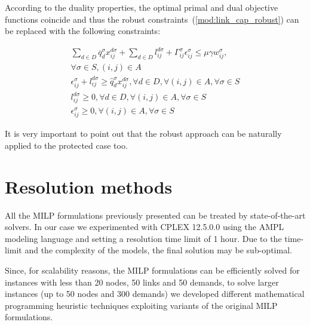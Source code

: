 \documentclass[final,5p,times,twocolumn]{elsarticle}
\begin{document}
According to the duality properties, the optimal primal and dual objective functions coincide and thus  the  robust constraints~(\ref{mod:link_cap_robust})  can be replaced with the following constraints:

\begin{eqnarray}
\label{mod:final_constraints_1}\sum_{d \in D} \overline{q}_d^{\sigma}x_{ij}^{d \sigma}+  \sum_{d \in D}l_{ij}^{d\sigma}+\Gamma_{ij}^{\sigma}\epsilon_{ij}^{\sigma} \leq \mu \gamma w_{ij}^{\sigma}, \\ \nonumber \forall \sigma \in S, (i,j) \in A \\ 
\epsilon_{ij}^{\sigma} + l_{ij}^{d\sigma} \geq \hat{q}_d^{\sigma} x_{ij}^{d \sigma},\forall d \in D, \forall (i,j) \in A, \forall \sigma \in S \\
l_{ij}^{d\sigma} \geq 0, \forall d \in D, \forall (i,j) \in A, \forall \sigma \in S \\
\label{mod:final_constraints_2}\epsilon_{ij}^{\sigma} \geq 0,\forall (i,j) \in A, \forall \sigma \in S \qquad \quad \,\,\,
\end{eqnarray}


It is very important to point out that the robust approach can be naturally applied to the protected case too. 

\section{Resolution methods}\label{sec:methods}
All the MILP formulations previously presented can be treated by  state-of-the-art solvers. 
In our case we experimented with CPLEX 12.5.0.0 using the AMPL modeling language and setting a resolution time limit of 1 hour. Due to the time-limit and the complexity of the models, the final solution may be sub-optimal. 

Since, for scalability reasons, the MILP formulations can be efficiently solved for instances with less than 20 nodes, 50 links and 50 demands, to solve larger instances (up to 50 nodes and 300 demands) we developed different mathematical programming heuristic techniques exploiting variants of the original MILP formulations. 
\end{document}
